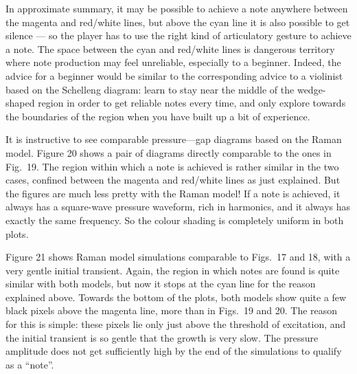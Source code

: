   In approximate summary, it may be possible to achieve a note anywhere between 
  the magenta and red/white lines, but above the cyan line it is also possible 
  to get silence — so the player has to use the right kind of articulatory 
  gesture to achieve a note. The space between the cyan and red/white lines is 
  dangerous territory where note production may feel unreliable, especially to 
  a beginner. Indeed, the advice for a beginner would be similar to the 
  corresponding advice to a violinist based on the Schelleng diagram: learn to 
  stay near the middle of the wedge-shaped region in order to get reliable 
  notes every time, and only explore towards the boundaries of the region when 
  you have built up a bit of experience. 

  It is instructive to see comparable pressure—gap diagrams based on the Raman 
  model. Figure 20 shows a pair of diagrams directly comparable to the ones in 
  Fig.\ 19. The region within which a note is achieved is rather similar in the 
  two cases, confined between the magenta and red/white lines as just 
  explained. But the figures are much less pretty with the Raman model! If a 
  note is achieved, it always has a square-wave pressure waveform, rich in 
  harmonics, and it always has exactly the same frequency. So the colour 
  shading is completely uniform in both plots. 



  Figure 21 shows Raman model simulations comparable to Figs.\ 17 and 18, with 
  a very gentle initial transient. Again, the region in which notes are found 
  is quite similar with both models, but now it stops at the cyan line for the 
  reason explained above. Towards the bottom of the plots, both models show 
  quite a few black pixels above the magenta line, more than in Figs.\ 19 and 
  20. The reason for this is simple: these pixels lie only just above the 
  threshold of excitation, and the initial transient is so gentle that the 
  growth is very slow. The pressure amplitude does not get sufficiently high by 
  the end of the simulations to qualify as a “note”. 



